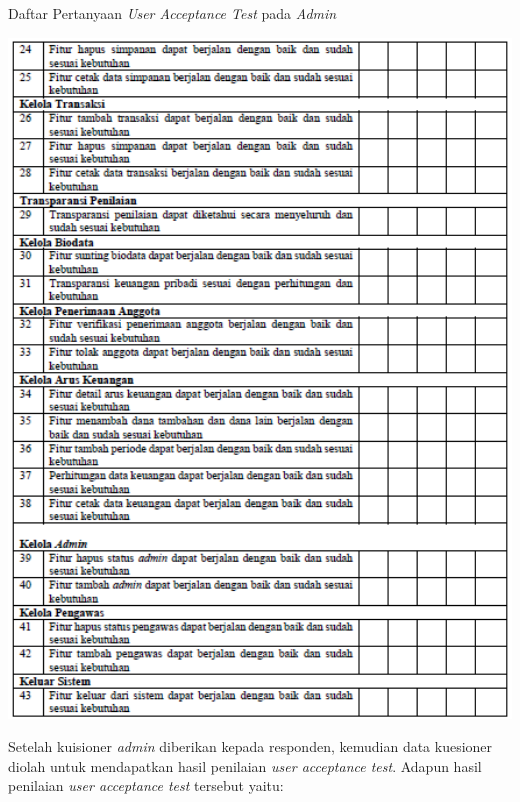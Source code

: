 \begin{table}[H]
	\centering
	\caption{Daftar Pertanyaan \textit{User Acceptance Test} pada \textit{Admin}}
	\includegraphics[width=1.0\textwidth]{gambar/Tabel_Admin2}
\end{table}

Setelah kuisioner \textit{admin} diberikan kepada responden, kemudian data kuesioner diolah untuk mendapatkan hasil penilaian \textit{user acceptance test}. Adapun hasil penilaian \textit{user acceptance test} tersebut yaitu:

